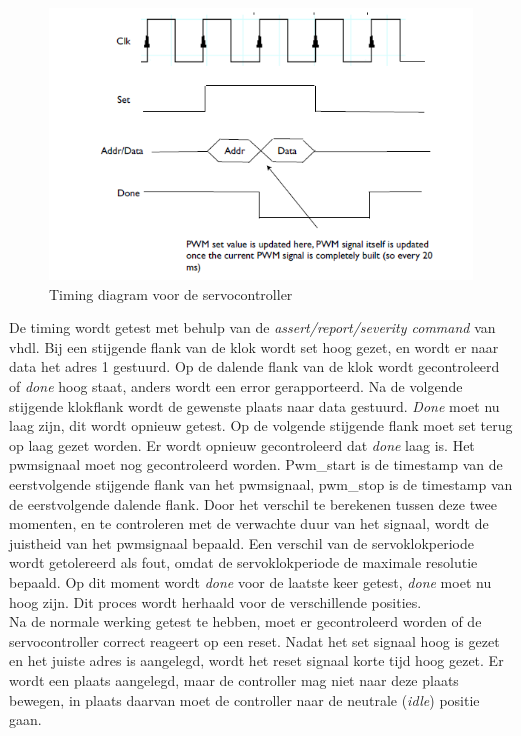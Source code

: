 \begin{figure}[H]
	\centering
	\includegraphics[width=\linewidth]{timing.png}
	\caption{Timing diagram voor de servocontroller}
\end{figure}
\noindent
De timing wordt getest met behulp van de \textit{assert/report/severity command} van \gls{vhdl}. Bij een stijgende flank van de klok wordt set hoog gezet, en wordt er naar data het adres 1 gestuurd. Op de dalende flank van de klok wordt gecontroleerd of \textit{done} hoog staat, anders wordt een error gerapporteerd. Na de volgende stijgende klokflank wordt de gewenste plaats naar data gestuurd. \textit{Done} moet nu laag zijn, dit wordt opnieuw getest. Op de volgende stijgende flank moet set terug op laag gezet worden. Er wordt opnieuw gecontroleerd dat \textit{done} laag is. Het \gls{pwm}signaal moet nog gecontroleerd worden. Pwm\_start is de timestamp van de eerstvolgende stijgende flank van het \gls{pwm}signaal, pwm\_stop is de timestamp van de eerstvolgende dalende flank. Door het verschil te berekenen tussen deze twee momenten, en te controleren met de verwachte duur van het signaal, wordt de juistheid van het \gls{pwm}signaal bepaald. Een verschil van de servoklokperiode wordt getolereerd als fout, omdat de servoklokperiode de maximale resolutie bepaald. Op dit moment wordt \textit{done} voor de laatste keer getest, \textit{done} moet nu hoog zijn. Dit proces wordt herhaald voor de verschillende posities.    \\

Na de normale werking getest te hebben, moet er gecontroleerd worden of de servocontroller correct reageert op een reset. Nadat het set signaal hoog is gezet en het juiste adres is aangelegd, wordt het reset signaal korte tijd hoog gezet. Er wordt een plaats aangelegd, maar de controller mag niet naar deze plaats bewegen, in plaats daarvan moet de controller naar de neutrale (\textit{idle}) positie gaan.

